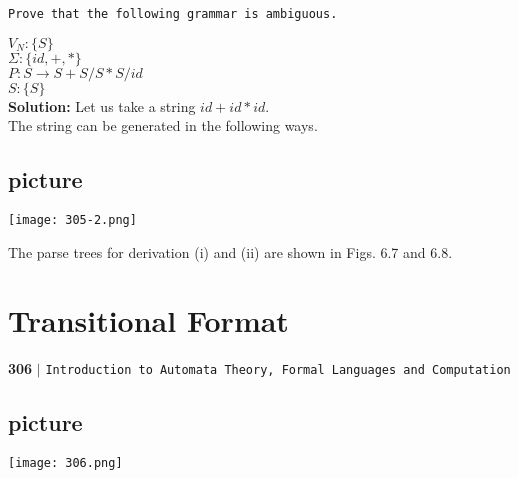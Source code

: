 \documentclass[9pt]{beamer}
\begin{document}
\begin{frame}
\hspace*{0.1cm} \texttt{Prove that the following grammar is ambiguous.}

\hspace*{4cm} $V_N: \{S\}$ \\
\hspace*{4cm} $\Sigma: \{id, +, *\}$ \\
\hspace*{4cm} $P: S \rightarrow S + S/S * S/id$ \\
\hspace*{4cm} $S: \{S\}$ \\

\textbf{Solution:} Let us take a string $id + id*id$.\\
The string can be generated in the following ways.\\

\vspace*{0.2cm}
\begin{flushleft}
\section{picture}
\texttt{[image: 305-2.png]}
\end{flushleft}

\vspace*{0.2cm}
\hspace*{0.5cm} The parse trees for derivation (i) and (ii) are shown in Figs. 6.7 and 6.8.\\
\end{frame}


\begin{frame}
\section*{Transitional Format}
\begin{flushleft}
    \textbf{306}\hspace*{0.1cm} \textbf{$|$} \hspace*{0.1cm} \texttt{Introduction to Automata Theory, Formal Languages and Computation}
  \end{flushleft}

\vspace*{0.5cm}
\begin{center}
\section{picture}
\texttt{[image: 306.png]}
\end{center}

\vspace*{0.3cm}
\end{frame}
\end{document}
